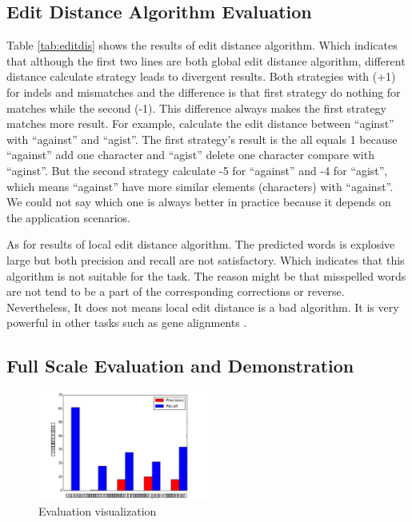 \documentclass[11pt]{article}
\begin{document}
\subsection{Edit Distance Algorithm Evaluation}

Table \ref{tab:editdis} shows the results of edit distance algorithm. Which indicates that although the first two lines are both global edit distance algorithm, different distance calculate strategy leads to divergent results. Both strategies with (+1) for indels and mismatches and the difference is that first strategy do nothing for matches while the second (-1). This difference always makes the first strategy matches more result. For example, calculate the edit distance between ``aginst'' with ``against'' and ``agist''. The first strategy's result is the all equals 1 because ``against'' add one character and ``agist'' delete one character compare with ``aginst''. But the second strategy calculate -5 for ``against'' and -4 for ``agist'', which means ``against'' have more similar elements (characters) with ``against''. We could not say which one is always better in practice because it depends on the application scenarios.

As for results of local edit distance algorithm. The predicted words is explosive large but both precision and recall are not satisfactory. Which indicates that this algorithm is not suitable for the task. The reason might be that misspelled words are not tend to be a part of the corresponding corrections or reverse. Nevertheless, It does not means local edit distance is a bad algorithm. It is very powerful in other tasks such as gene alignments \cite{Altschul1986Locally}.

\subsection{Full Scale Evaluation and Demonstration}

\begin{figure}
	\centering
	\includegraphics[width=0.5\textwidth]{img/evaluate.pdf}
	\caption{Evaluation visualization}
	\label{fig:evaluate}
\end{figure}
\end{document}
